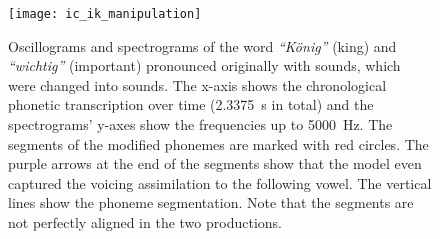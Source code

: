 \begin{landscape}
	\begin{figure}[t]
		\centering
		\vspace*{-2cm}
		\hspace*{-2cm}
		\texttt{[image: ic\_ik\_manipulation]}
		\caption[Oscillograms and spectrograms of categorical manipulation comparison]
			{Oscillograms and spectrograms of the word \emph{\enquote{König}} (king) and \emph{\enquote{wichtig}} (important) pronounced originally with \textipa{[\c{c}]} sounds, which were changed into \textipa{[k]} sounds.
			The x-axis shows the chronological phonetic transcription over time (\SI{2.3375}{\second} in total) and the spectrograms' y-axes show the frequencies up to \SI{5000}{\hertz}.
			The segments of the modified phonemes are marked with red circles.
			The purple arrows at the end of the \textipa{[k]} segments show that the model even captured the voicing assimilation to the following vowel.
			The vertical lines show the phoneme segmentation.
			Note that the segments are not perfectly aligned in the two productions.}
		\label{fig:spectrogram_ic_ik}
	\end{figure}
\end{landscape}